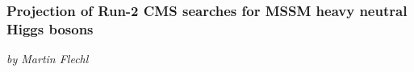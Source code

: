 \subsubsection{Projection of Run-2 CMS searches for MSSM heavy neutral Higgs bosons}\label{sec:CMShtt}
\begin{center}
 {\it{ by Martin Flechl}}
\end{center}





